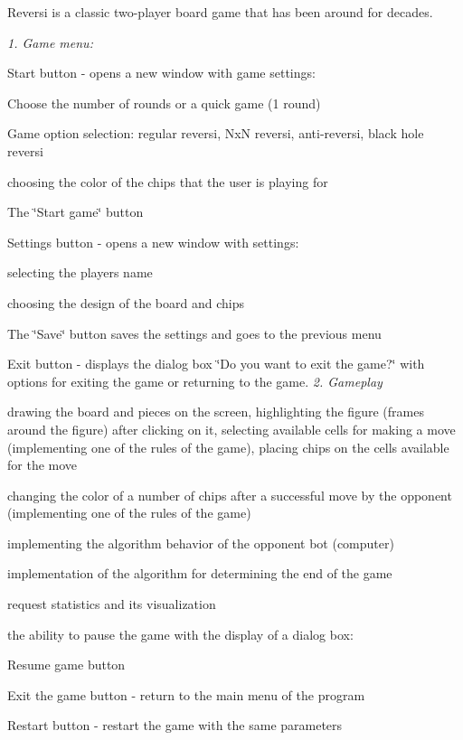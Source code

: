 \label{index_md_README}%
%
Reversi is a classic two-\/player board game that has been around for decades.



{\itshape 1. Game menu\+:}
\begin{DoxyItemize}
\item Start button -\/ opens a new window with game settings\+:
\item Choose the number of rounds or a quick game (1 round)
\item Game option selection\+: regular reversi, NxN reversi, anti-\/reversi, black hole reversi
\item choosing the color of the chips that the user is playing for
\item The \char`\"{}\+Start game\char`\"{} button
\item Settings button -\/ opens a new window with settings\+:
\item selecting the player\textquotesingle{}s name
\item choosing the design of the board and chips
\item The \char`\"{}\+Save\char`\"{} button saves the settings and goes to the previous menu
\item Exit button -\/ displays the dialog box \char`\"{}\+Do you want to exit the game?\char`\"{} with options for exiting the game or returning to the game. {\itshape 2. Gameplay}
\item drawing the board and pieces on the screen, highlighting the figure (frames around the figure) after clicking on it, selecting available cells for making a move (implementing one of the rules of the game), placing chips on the cells available for the move
\item changing the color of a number of chips after a successful move by the opponent (implementing one of the rules of the game)
\item implementing the algorithm behavior of the opponent bot (computer)
\item implementation of the algorithm for determining the end of the game
\item request statistics and its visualization
\item the ability to pause the game with the display of a dialog box\+:
\item Resume game button
\item Exit the game button -\/ return to the main menu of the program
\item Restart button -\/ restart the game with the same parameters

\end{DoxyItemize}
